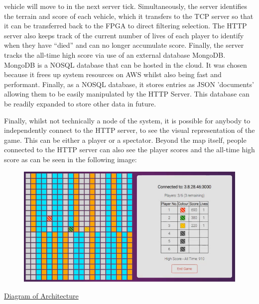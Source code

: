 \documentclass[12pt,a4paper]{article}
\begin{document}
{vehicle will move to in the next server tick. Simultaneously, the server identifies 
the terrain and score of each vehicle, which it transfers to the TCP server so that 
it can be transferred back to the FPGA to direct filtering selection. The HTTP 
server also keeps track of the current number of lives of each player to identify 
when they have “died” and can no longer accumulate score. Finally, the server tracks 
the all-time high score via use of an external database MongoDB. MongoDB is a NOSQL 
database that can be hosted in the cloud. It was chosen because it frees up system 
resources on AWS whilst also being fast and performant. Finally, as a NOSQL database, 
it stores entries as JSON 'documents' allowing them to be easily manipulated by the 
HTTP Server. This database can be readily expanded to store other data in future. 
\par
Finally, whilst not technically a node of the system, it is possible for anybody to 
independently connect to the HTTP server, to see the visual representation of the 
game. This can be either a player or a spectator. Beyond the map itself, people 
connected to the HTTP server can also see the player scores and the all-time high 
score as can be seen in the following image:}
\par
\begin{figure} [h!]
    \centering
    \includegraphics[scale = 0.75]{Website.png}
\end{figure}
\par
\underline{\small Diagram of Architecture}
\par
\end{document}
